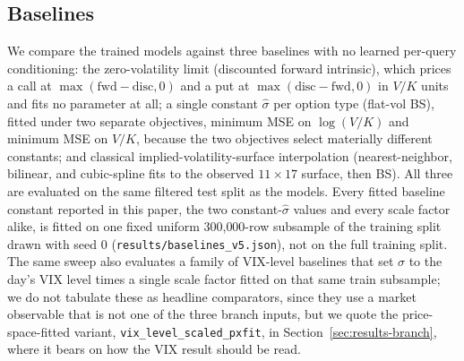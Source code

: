 \documentclass[11pt]{article}
\begin{document}
\subsection{Baselines}
\label{sec:baselines-method}
We compare the trained models against three baselines with no learned per-query conditioning: the
zero-volatility limit (discounted forward intrinsic), which prices a call at
$\max(\mathrm{fwd}-\mathrm{disc},0)$ and a put at $\max(\mathrm{disc}-\mathrm{fwd},0)$ in $V/K$ units
and fits no parameter at all; a single constant $\hat\sigma$ per option type (flat-vol BS), fitted
under two separate objectives, minimum MSE on $\log(V/K)$ and minimum MSE on $V/K$,
because the two objectives select materially different constants; and classical implied-volatility-surface
interpolation (nearest-neighbor, bilinear, and cubic-spline fits to the observed $11 \times 17$
surface, then BS). All three are evaluated on the same filtered test split as the models. Every
fitted baseline constant reported in this paper, the two constant-$\hat\sigma$ values and every scale
factor alike, is fitted on one fixed uniform 300{,}000-row subsample of the training split drawn with
seed 0 (\texttt{results/baselines\_v5.json}), not on the full training split. The same
sweep also evaluates a family of VIX-level baselines that set $\hat\sigma$ to the day's VIX level times
a single scale factor fitted on that same train subsample; we do not tabulate these as headline
comparators, since they use a market observable that is not one of the three branch inputs, but we
quote the price-space-fitted variant, \texttt{vix\_level\_scaled\_pxfit}, in
Section~\ref{sec:results-branch}, where it bears on how the VIX result should be read.
\end{document}
